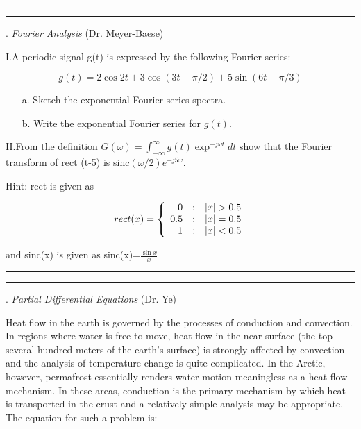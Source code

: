 \documentclass [11point]{article}
\begin{document}
\bigskip
\hrule 




\pagebreak
\hrule 
{}. \textit{Fourier Analysis} (Dr. Meyer-Baese)
\bigskip

I.\quad A periodic signal g(t) is expressed by the following Fourier
series:

\begin{equation}
g(t)= 2\cos 2t + 3 \cos(3t-\pi/2) + 5\sin(6t - \pi/3)
\end{equation}

\begin{enumerate}

\item[a.] Sketch the exponential Fourier
 series spectra.

\item[b.] Write the exponential Fourier series for $g(t)$.


\end{enumerate}

II.\quad From the definition $G(\omega)=\int_{-\infty}^{\infty}
g(t)\exp^{-j\omega t}dt $ show that the Fourier transform of rect
(t-5) is sinc$(\omega/2)e^{-j5\omega}$.

\vspace*{0.5cm}

Hint: $\mbox{rect}$ is given as

\begin{equation}
rect(x) = \left\{\begin{array}{r@{\quad:\quad}l}
 0 & |x|>0.5 \\ 0.5
& |x|=0.5 \\ 1  & |x|<0.5
\end{array} \right.
\end{equation}

\noindent and sinc(x) is given as sinc(x)=$\frac{\sin{x}}{x}$

\bigskip
\hrule 

\pagebreak
\hrule 
{}. \textit{Partial Differential Equations} (Dr. Ye)
\bigskip

Heat flow in the earth is governed by the processes of conduction and convection. In regions where water is free to move, heat flow in the near surface (the top several hundred meters of the earth’s surface) is strongly affected by convection and the analysis of temperature change is quite complicated. In the Arctic, however, permafrost essentially renders water motion meaningless as a heat-flow mechanism. In these areas, conduction is the primary mechanism by which heat is transported in the crust and a relatively simple analysis may be appropriate. The equation for such a problem is:
\end{document}
